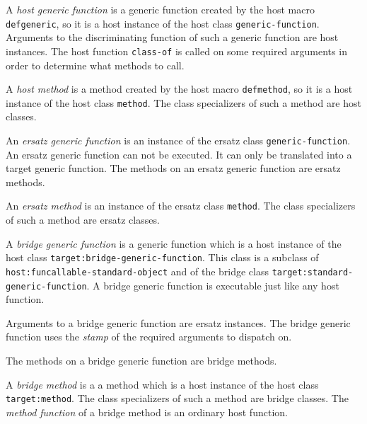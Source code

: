 \begin{definition}
A \emph{host generic function} is a generic function created by the
host macro \texttt{defgeneric}, so it is a host instance of the host
class \texttt{generic-function}.  Arguments to the discriminating
function of such a generic function are host instances.  The host
function \texttt{class-of} is called on some required arguments in
order to determine what methods to call.
\end{definition}

\begin{definition}
A \emph{host method} is a method created by the host macro
\texttt{defmethod}, so it is a host instance of the host class
\texttt{method}.  The class specializers of such a method are host
classes.
\end{definition}

\begin{definition}
An \emph{ersatz generic function} is an instance of the ersatz class
\texttt{generic-function}.  An ersatz generic function can not be
executed.  It can only be translated into a target generic function.
The methods on an ersatz generic function are ersatz methods.
\end{definition}

\begin{definition}
An \emph{ersatz method} is an instance of the ersatz class
\texttt{method}.  The class specializers of such a method are ersatz
classes.
\end{definition}

\begin{definition}
A \emph{bridge generic function} is a generic function which is a host
instance of the host class \texttt{target:bridge-generic-function}.
This class is a subclass of \texttt{host:funcallable-standard-object}
and of the bridge class \texttt{target:standard-generic-function}.
A bridge generic function is executable just like any host function.

Arguments to a bridge generic function are ersatz instances.  The
bridge generic function uses the 
\emph{stamp}
 of
the required arguments to dispatch on. 

The methods on a bridge generic function are bridge methods.
\end{definition}

\begin{definition}
A \emph{bridge method} is a a method which is a host instance of the host
class \texttt{target:method}.  The class specializers of such a method are
bridge classes.  The \emph{method function} of a bridge method is an
ordinary host function.
\end{definition}

